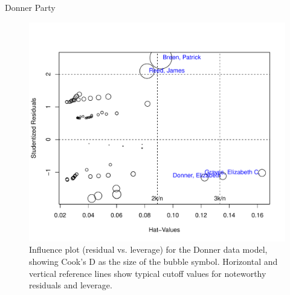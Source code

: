 \documentclass[11pt]{book}
\renewenvironment{knitrout}{\small\renewcommand{\baselinestretch}{.85}}{} %
\begin{document}
\begin{Example}[donner2]{Donner Party}
\begin{knitrout}
\color{fgcolor}\begin{kframe}
\begin{alltt}
 \hlkwb{<-}  \hlstd{=}\hlstd{,} \hlstd{=}\hlstd{,} \hlstd{=}\hlstd{)}
\hlstd{(}\hlstd{=}\hlstd{(}\hlstd{,} \hlstd{)}\hlopt{*}\hlopt{/} \hlstd{=}\hlopt{-}\hlstd{,} \hlstd{(}\hlstd{,} \hlstd{))}
\end{alltt}
\end{kframe}\begin{figure}[!htbp]


\centerline{\includegraphics[width=.6\textwidth]{ch07/fig/donner2-inflplot} }

\caption[Influence plot (residual vs]{Influence plot (residual vs. leverage) for the Donner data model, showing Cook's D as the size of the bubble symbol. Horizontal and vertical reference lines show typical cutoff values for noteworthy residuals and leverage.\label{fig:donner2-inflplot}}
\end{figure}


\end{knitrout}


\end{Example}
\end{document}
